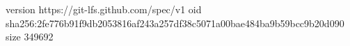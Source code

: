 version https://git-lfs.github.com/spec/v1
oid sha256:2fe776b91f9db2053816af243a257df38c5071a00bae484ba9b59bcc9b20d090
size 349692
